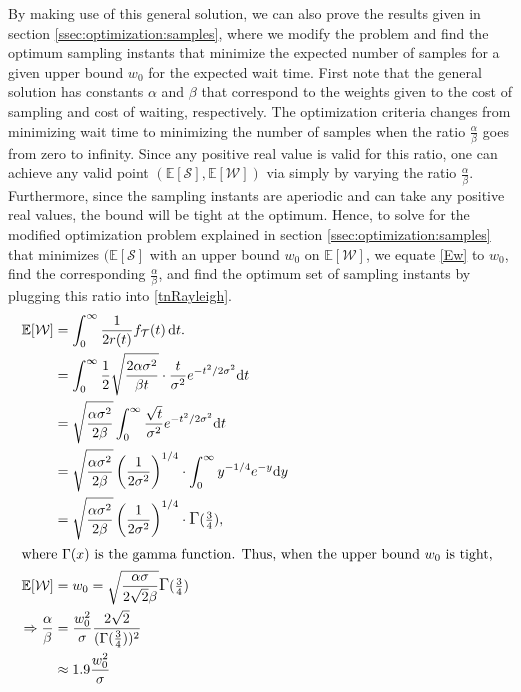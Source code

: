 By making use of this general solution, we can also prove the results given in section \cref{ssec:optimization:samples}, where we modify the problem and find the optimum sampling instants that minimize the expected number of samples for a given upper bound $w_0$ for the expected wait time.
First note that the general solution has constants $\alpha$ and $\beta$ that correspond to the weights given to the cost of sampling and cost of waiting, respectively.
The optimization criteria changes from minimizing wait time to minimizing the number of samples when the ratio $\frac{\alpha}{\beta}$ goes from zero to infinity.
Since any positive real value is valid for this ratio, one can achieve any valid point $(\mathbb{E}[\mathcal{S}],\mathbb{E}[\mathcal{W}])$ via simply by varying the ratio $\frac{\alpha}{\beta}$.
Furthermore, since the sampling instants are aperiodic and can take any positive real values, the bound will be tight at the optimum.
Hence, to solve for the modified optimization problem explained in section \cref{ssec:optimization:samples} that minimizes $(\mathbb{E}[\mathcal{S}]$ with an upper bound $w_0$ on $\mathbb{E}[\mathcal{W}]$, we equate \cref{Ew} to $w_0$, find the corresponding $\frac{\alpha}{\beta}$, and find the optimum set of sampling instants by plugging this ratio into \cref{tnRayleigh}.
\begin{alignat*}{1}
\mathbb{E}[\mathcal{W}]&=\int_{0}^{\infty}\dfrac{1}{2r(t)}f_\mathcal{T}(t)\,\mathrm{d}t.\nonumber\\
&=\int_{0}^{\infty}\frac{1}{2}\sqrt{\frac{2\alpha\sigma^2}{\beta t}}\cdot \frac{t}{\sigma^2}e^{-{t^2}/{2\sigma^2}}\mathrm{d}t\\
&=\sqrt{\frac{\alpha\sigma^2}{2\beta}}\int_{0}^{\infty}\frac{\sqrt{t}}{\sigma^2}e^{-{t^2}/{2\sigma^2}}\mathrm{d}t\\
&=\sqrt{\frac{\alpha\sigma^2}{2\beta}}\left({\frac{1}{{2}\sigma^2}}\right)^{1/4}\cdot\int_{0}^{\infty}y^{-1/4}e^{-y}\mathrm{d}y\\
&=\sqrt{\frac{\alpha\sigma^2}{2\beta}}\left({\frac{1}{{2}\sigma^2}}\right)^{1/4}\cdot\mathlarger{\Gamma}(\tfrac{3}{4}),\\
\intertext{%
    where $\mathlarger{\Gamma(x)}$ is the gamma function.
    Thus, when the upper bound $w_0$ is tight,
}
\mathbb{E}[\mathcal{W}]&=w_0=\sqrt{\frac{\alpha\sigma}{2\sqrt{2}\beta}}\mathlarger{\Gamma}(\tfrac{3}{4})\\
\Rightarrow\frac{\alpha}{\beta}&=\frac{w_0^2}{\sigma}\frac{2\sqrt{2}}{(\mathlarger{\Gamma}(\tfrac{3}{4}))^2}\\
&\approx1.9\frac{w_0^2}{\sigma}
\end{alignat*}
